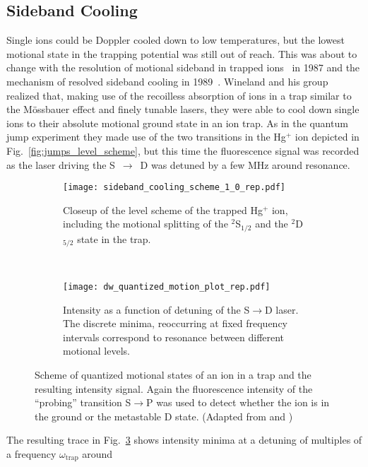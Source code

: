 \subsection{Sideband Cooling}
Single ions could be Doppler cooled down to low temperatures, but the lowest
motional state in the trapping potential was still out of reach. This was about
to change with the resolution of motional sideband in trapped
ions~\cite{bergquist1987recoilless} in 1987 and the mechanism of resolved sideband
cooling in 1989~\cite{diedrich1989laser}. Wineland and his group realized that,
making use of the recoilless absorption of ions in a trap similar to the
Mössbauer effect and finely tunable lasers, they were able to cool down single
ions to their absolute motional ground state in an ion trap. As in the
quantum jump experiment they made use of the two transitions in the Hg$^+$ ion
depicted in Fig.~\ref{fig:jumps_level_scheme}, but this time the fluorescence
signal was recorded as the laser driving the S~$\rightarrow$~D was detuned by a
few \si{\mega\hertz} around resonance.
\begin{figure}[t]
  \centering
  \begin{subfigure}[t]{0.48\linewidth} 
    \centering
    \texttt{[image: sideband\_cooling\_scheme\_1\_0\_rep.pdf]}
    \caption{Closeup of the level scheme of the trapped Hg$^+$ ion, including the motional
      splitting of the $^2$S$_{1/2}$ and the $^2$D$_{5/2}$ state in the trap.}
    \label{fig:motional_scheme1}
  \end{subfigure}
  ~
  \begin{subfigure}[t]{0.48\linewidth} 
    \centering
    \texttt{[image: dw\_quantized\_motion\_plot\_rep.pdf]}
    \caption{Intensity as a function of detuning of the S$\rightarrow$D laser.
    The discrete minima, reoccurring at fixed frequency intervals correspond to
  resonance between different motional levels.}
    \label{fig:quantized_motion_results}
  \end{subfigure}
  \caption{Scheme of quantized motional states of an ion in a trap and the
  resulting intensity signal. Again the fluorescence intensity of the
``probing'' transition S$\rightarrow$P was used to detect whether the ion is in
the ground or the metastable D state. (Adapted from
\cite{bergquist1987recoilless} and \cite{wineland2012nobel})}
\end{figure}
The resulting trace in Fig.~\ref{fig:quantized_motion_results} shows intensity
minima at a detuning of multiples of a frequency $\omega_{\text{trap}}$ around
